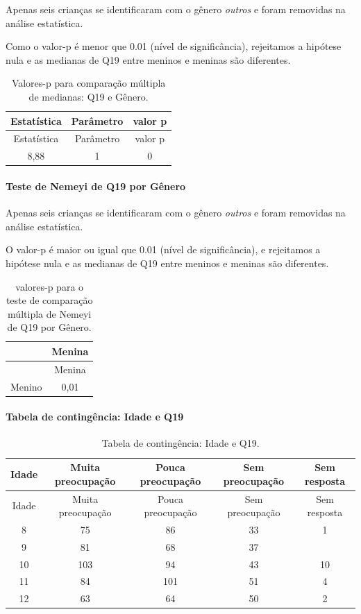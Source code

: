 \documentclass[]{article}
\let\oldparagraph\paragraph
\renewcommand{\paragraph}[1]{\oldparagraph{#1}\mbox{}}
\begin{document}
Apenas seis crianças se identificaram com o gênero \emph{outros} e foram removidas na análise estatística.

Como o valor-p é menor que 0.01 (nível de significância), rejeitamos a hipótese nula e as medianas de Q19 entre meninos e meninas são diferentes.

\begin{longtable}[]{@{}ccc@{}}
\caption{\label{tab:unnamed-chunk-324}Valores-p para comparação múltipla de medianas: Q19 e Gênero.}\tabularnewline
\toprule
Estatística & Parâmetro & valor p\tabularnewline
\midrule
\endfirsthead
\toprule
Estatística & Parâmetro & valor p\tabularnewline
\midrule
\endhead
8,88 & 1 & 0\tabularnewline
\bottomrule
\end{longtable}

\hypertarget{teste-de-nemeyi-de-q19-por-guxeanero}{%
\paragraph{Teste de Nemeyi de Q19 por Gênero}\label{teste-de-nemeyi-de-q19-por-guxeanero}}

Apenas seis crianças se identificaram com o gênero \emph{outros} e foram removidas na análise estatística.

O valor-p é maior ou igual que 0.01 (nível de significância), e rejeitamos a hipótese nula e as medianas de Q19 entre meninos e meninas são diferentes.

\begin{longtable}[]{@{}lc@{}}
\caption{\label{tab:unnamed-chunk-326}valores-p para o teste de comparação múltipla de Nemeyi de Q19 por Gênero.}\tabularnewline
\toprule
& Menina\tabularnewline
\midrule
\endfirsthead
\toprule
& Menina\tabularnewline
\midrule
\endhead
Menino & 0,01\tabularnewline
\bottomrule
\end{longtable}

\cleardoublepage

\hypertarget{tabela-de-continguxeancia-idade-e-q19}{%
\paragraph{Tabela de contingência: Idade e Q19}\label{tabela-de-continguxeancia-idade-e-q19}}

\begin{longtable}[]{@{}ccccc@{}}
\caption{\label{tab:unnamed-chunk-327}Tabela de contingência: Idade e Q19.}\tabularnewline
\toprule
Idade & Muita preocupação & Pouca preocupação & Sem preocupação & Sem resposta\tabularnewline
\midrule
\endfirsthead
\toprule
Idade & Muita preocupação & Pouca preocupação & Sem preocupação & Sem resposta\tabularnewline
\midrule
\endhead
8 & 75 & 86 & 33 & 1\tabularnewline
9 & 81 & 68 & 37 &\tabularnewline
10 & 103 & 94 & 43 & 10\tabularnewline
11 & 84 & 101 & 51 & 4\tabularnewline
12 & 63 & 64 & 50 & 2\tabularnewline
\bottomrule
\end{longtable}
\end{document}
